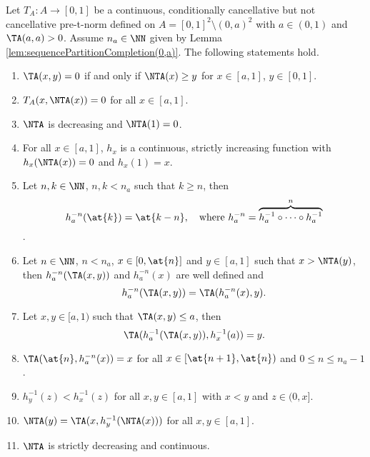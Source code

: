 \begin{lemma}\label{lem:CompletionCase(0,a)HorizontalSection}
	Let $T_A: A \to [0,1]$ be a continuous, conditionally cancellative but not cancellative pre-t-norm defined on $A=[0,1]^2 \setminus (0,a)^2$ with $a \in (0,1)$ and $\TA(a,a)>0$. Assume $n_a \in \NN$ given by Lemma \ref{lem:sequencePartitionCompletion(0,a)}. The following statements hold.
	\begin{enumerate}[label=(\roman*)]
		\item $\TA(x,y)=0$ if and only if $\NTA(x) \geq y$ for $x \in [a,1]$, $y \in [0,1]$.
		\item $T_A(x,\NTA(x))=0$ for all $x \in [a,1]$.
		\item $\NTA$ is decreasing and $\NTA(1)=0$.
		\item For all $x \in [a,1]$,  $h_x$ is a continuous, strictly increasing function with $h_x(\NTA(x))=0$ and $h_x(1)=x$.
		\item Let $n,k \in \NN$, $n,k<n_a$ such that $k \geq n$, then
		$$h_a^{-n}(\at{k}) = \at{k-n}, \quad
		\text{where } h_a^{-n} = \overbrace{h_a^{-1} \circ \dots \circ h_a^{-1}}^n$$.
		\item Let $n \in \NN$, $n < n_a$, $x \in [0,\at{n}]$ and $y \in [a,1]$ such that $x>\NTA(y)$, then $h_a^{-n}(\TA(x,y))$ and $h_a^{-n}(x)$ are well defined and
		\begin{equation}\label{eq:CompletionCase(0,a)Propertyha1}
			h_a^{-n}(\TA(x,y))=\TA(h_a^{-n}(x),y).
		\end{equation}
		\item Let $x,y \in [a,1)$ such that $\TA(x,y) \leq a$, then
		\begin{equation}\label{eq:CompletionCase(0,a)Propertyha2}
			\TA(h_a^{-1}(\TA(x,y)),h_x^{-1}(a))=y.
		\end{equation}
		\item $\TA(\at{n},h_a^{-n}(x))=x$ for all $x \in [\at{n+1},\at{n})$ and $0 \leq n \leq n_a-1$.
		\item $h_y^{-1}(z) < h_x^{-1}(z)$ for all $x,y \in [a,1]$ with $x<y$ and $z \in (0,x]$.
		\item $\NTA(y)=\TA(x,h_y^{-1}(\NTA(x)))$ for all $x,y \in [a,1]$.
		\item $\NTA$ is strictly decreasing and continuous.
	\end{enumerate}
\end{lemma}
